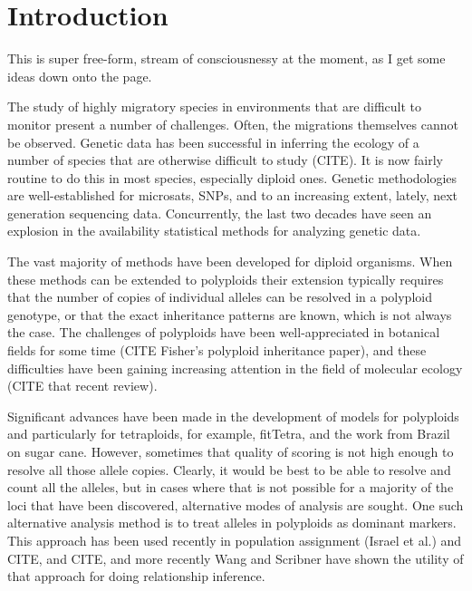 
\section*{Introduction}

This is super free-form, stream of consciousnessy at the moment, as I get some ideas
down onto the page.

The study of highly migratory species in environments that are difficult to monitor present
a number of challenges.   Often, the migrations themselves cannot be observed.
Genetic data has been successful in inferring the ecology of a number of species
that are otherwise difficult to study (CITE).  It is now fairly routine to do this
in most species, especially diploid ones.  Genetic methodologies are well-established for microsats, SNPs, and to an increasing extent, lately, next generation sequencing data.
Concurrently, the last two decades have seen an explosion in the availability statistical
methods for analyzing genetic data.  

The vast majority of methods have been developed for diploid organisms.  When these methods
can be extended to polyploids their extension
typically requires that the number of copies of individual alleles can be resolved in a
polyploid genotype, or that the exact inheritance patterns are known, which is not always
the case.  The challenges of polyploids have been
well-appreciated in botanical fields for some time (CITE Fisher's polyploid inheritance
paper), and these difficulties have been gaining increasing attention in the field of
molecular ecology (CITE that recent review).  

Significant advances have been made in the development of models for polyploids and
particularly for tetraploids, for example, fitTetra, and the work from Brazil on
sugar cane.  However, sometimes that quality of scoring is not high enough to 
resolve all those allele copies. Clearly, it would be best to be able to resolve
and count all the alleles, but in cases where that is not possible for a majority of the
loci that have been discovered, alternative modes of analysis are sought.  One such
alternative analysis method is to treat alleles in polyploids as dominant markers.  This
approach has been used recently in population assignment (Israel et al.) and CITE, and CITE,
and more recently Wang and Scribner have shown the utility of that approach for doing
relationship inference.  

